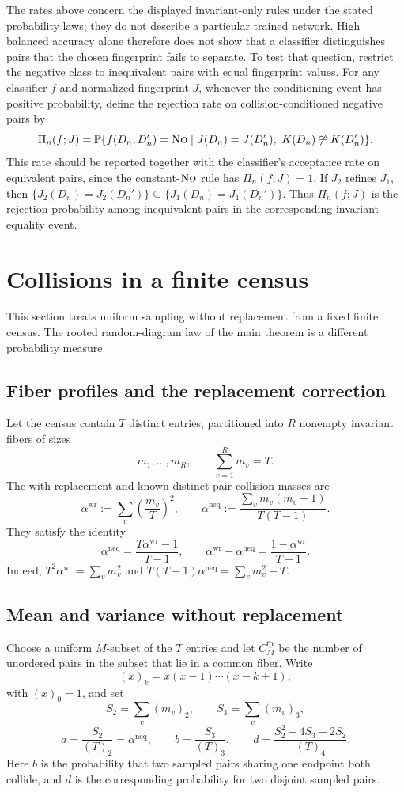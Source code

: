 \documentclass[9pt,twoside]{pnas-new}
\theoremstyle{definition}
\theoremstyle{remark}
\renewcommand{\Pr}{\mathbb{P}}
\newcommand{\neqp}{\mathrm{neq}}
\newcommand{\wrp}{\mathrm{wr}}
\begin{document}
The rates above concern the displayed invariant-only rules under the stated probability laws; they do not describe a particular trained network. High balanced accuracy alone therefore does not show that a classifier distinguishes pairs that the chosen fingerprint fails to separate. To test that question, restrict the negative class to inequivalent pairs with equal fingerprint values. For any classifier $f$ and normalized fingerprint $J$, whenever the conditioning event has positive probability, define the rejection rate on collision-conditioned negative pairs by
\[
 \Pi_n(f;J)=
 \Pr\{f(D_n,D_n')=\textup{\textsc{No}}\mid J(D_n)=J(D_n'),\ K(D_n)\not\cong K(D_n')\}.
\]
This rate should be reported together with the classifier's acceptance rate on equivalent pairs, since the constant-$\textup{\textsc{No}}$ rule has $\Pi_n(f;J)=1$.  If $J_2$ refines $J_1$, then $\{J_2(D_n)=J_2(D_n')\}\subseteq\{J_1(D_n)=J_1(D_n')\}$.  Thus $\Pi_n(f;J)$ is the rejection probability among inequivalent pairs in the corresponding invariant-equality event.
\section{Collisions in a finite census}
\label{si:finite-population}
This section treats uniform sampling without replacement from a fixed finite census.  The rooted random-diagram law of the main theorem is a different probability measure.

\subsection{Fiber profiles and the replacement correction}
Let the census contain $T$ distinct entries, partitioned into $R$ nonempty invariant fibers of sizes
\[
 m_1,\ldots,m_R,
 \qquad
 \sum_{v=1}^R m_v=T.
\]
The with-replacement and known-distinct pair-collision masses are
\[
 \alpha^{\wrp}:=\sum_v\left(\frac{m_v}{T}\right)^2,
 \qquad
 \alpha^{\neqp}:=\frac{\sum_vm_v(m_v-1)}{T(T-1)}.
\]
They satisfy the identity
\begin{equation}
 \alpha^{\neqp}
 =\frac{T\alpha^{\wrp}-1}{T-1},
 \qquad
 \alpha^{\wrp}-\alpha^{\neqp}
 =\frac{1-\alpha^{\wrp}}{T-1}.
 \label{si:eq:replacement-correction}
\end{equation}
Indeed, $T^2\alpha^{\wrp}=\sum_vm_v^2$ and
$T(T-1)\alpha^{\neqp}=\sum_vm_v^2-T$.

\subsection{Mean and variance without replacement}
Choose a uniform $M$-subset of the $T$ entries and let $C_M^{\mathrm{fp}}$ be the number of unordered pairs in the subset that lie in a common fiber.  Write
\[
 (x)_k=x(x-1)\cdots(x-k+1),
\]
with $(x)_0=1$, and set
\[
 S_2=\sum_v(m_v)_2,
 \qquad
 S_3=\sum_v(m_v)_3,
\]
\[
 a=\frac{S_2}{(T)_2}=\alpha^{\neqp},
 \qquad
 b=\frac{S_3}{(T)_3},
 \qquad
 d=\frac{S_2^2-4S_3-2S_2}{(T)_4}.
\]
Here $b$ is the probability that two sampled pairs sharing one endpoint both collide, and $d$ is the corresponding probability for two disjoint sampled pairs.
\end{document}
